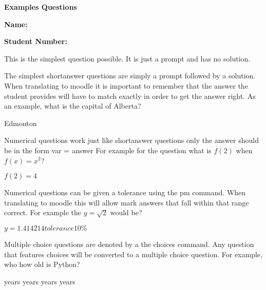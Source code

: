 \documentclass[12pt]{exam}
\begin{document}
        \begin{center}
            \textbf{Examples Questions}
        \end{center}

        \textbf{Name:} %

        \textbf{Student Number:} %

        \begin{questions}

                This is the simplest question possible. It is just a prompt and has no solution.

                The simplest shortanswer questions are simply a prompt followed by a solution. When translating to moodle
                it is important to remember that the answer the student provides will have to match exactly in order to
                get the answer right. As an example, what is the capital of Alberta?
                \begin{solution}
                    Edmonton
                \end{solution}

                Numerical questions work just like shortanswer questions only the answer should be in the form var = answer
                For example for the question what is $f(2)$ when $f(x) = x^2$?
                \begin{solution}
                    $f(2) = 4$
                \end{solution}

                Numerical questions can be given a tolerance using the pm command. When translating to moodle this
                will allow mark answers that fall within that range correct. For example the $y=\sqrt{2}$ would be?
                \begin{solution}
                    $y=1.414214 tolerance 10\%$
                \end{solution}

                Multiple choice questions are denoted by a the choices command. Any question that features choices
                will be converted to a multiple choice question. For example, who how old is Python?
                \begin{choices}
                     years
                     years
                     years
                     years
                \end{choices}


\end{questions}
\end{document}
